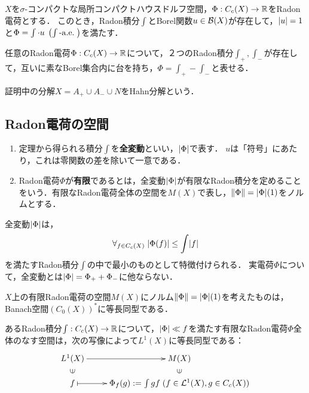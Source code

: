 \documentclass[uplatex,dvipdfmx]{jsreport}
\begin{document}
\begin{theorem}
    $X$を$\sigma$-コンパクトな局所コンパクトハウスドルフ空間，$\Phi:C_c(X)\to\mathbb{R}$をRadon電荷とする．
    このとき，Radon積分$\int$とBorel関数$u\in\mathcal{B}(X)$が存在して，$\lvert u\rvert=1$と$\Phi=\int\cdot u\;\left(\int\text{-}\mathrm{a.e.}\;\right)$を満たす．
\end{theorem}

\begin{corollary}
    任意のRadon電荷$\Phi:C_c(X)\to\mathbb{R}$について，２つのRadon積分$\int_+,\int_-$が存在して，互いに素なBorel集合内に台を持ち，$\Phi=\int_+-\int_-$と表せる．
\end{corollary}
\begin{remarks}
    証明中の分解$X=A_+\cup A_-\cup N$をHahn分解という．
\end{remarks}

\subsection{Radon電荷の空間}

\begin{definition}\mbox{}
    \begin{enumerate}
        \item 定理から得られる積分$\int$を\textbf{全変動}といい，$\lvert\Phi\rvert$で表す．
        $u$は「符号」にあたり，これは零関数の差を除いて一意である．
        \item Radon電荷$\Phi$が\textbf{有限}であるとは，全変動$\lvert\Phi\rvert$が有限なRadon積分を定めることをいう．有限なRadon電荷全体の空間を$M(X)$で表し，$\|\Phi\|=\lvert\Phi\rvert(1)$をノルムとする．
    \end{enumerate}
\end{definition}
\begin{remark}
    全変動$\lvert\Phi\rvert$は，
    \[\forall_{f\in C_c(X)}\;\lvert\Phi(f)\rvert\le\int\lvert f\rvert\]
    を満たすRadon積分$\int$の中で最小のものとして特徴付けられる．
    実電荷$\Phi$について，全変動とは$\lvert\Phi\rvert=\Phi_++\Phi_-$に他ならない．
\end{remark}

\begin{proposition}\label{prop-Riesz-Markov-3}
    $X$上の有限Radon電荷の空間$M(X)$にノルム$\|\Phi\|=\lvert\Phi\rvert(1)$を考えたものは，Banach空間$(C_0(X))^*$に等長同型である．
\end{proposition}

\begin{proposition}[絶対連続測度の表現]\label{prop-Riesz-4}
    あるRadon積分$\int:C_c(X)\to\mathbb{R}$について，$\lvert\Phi\rvert\ll f$を満たす有限なRadon電荷$\Phi$全体のなす空間は，次の写像によって$L^1(X)$に等長同型である：
    \[\xymatrix@R-2pc{
        L^1(X)\ar[r]&M(X)\\
        \rotatebox[origin=c]{90}{$\in$}&\rotatebox[origin=c]{90}{$\in$}\\
        f\ar@{|->}[r]&\Phi_f(g):=\int gf\;(f\in\L^1(X),g\in C_c(X))
    }\]
\end{proposition}
\end{document}
